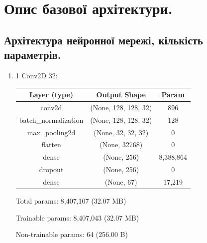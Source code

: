 \documentclass{article}
\begin{document}
    \section{Опис базової архітектури.}
    \subsection{Архітектура нейронної мережі, кількість параметрів.}
    \begin{enumerate}
        \item 1 Conv2D 32:
            \begin{table}[h!]
                \centering
                \begin{tabular}{| c | c | c |}
                    \hline
                    Layer (type) & Output Shape & Param \\
                    \hline
                    conv2d & (None, 128, 128, 32) & 896 \\
                    \hline
                    batch\_normalization & (None, 128, 128, 32) & 128 \\
                    \hline
                    max\_pooling2d & (None, 32, 32, 32) & 0 \\
                    \hline
                    flatten & (None, 32768) & 0 \\
                    \hline
                    dense & (None, 256) & 8,388,864 \\
                    \hline
                    dropout & (None, 256) & 0 \\
                    \hline
                    dense & (None, 67) & 17,219 \\
                    \hline
                \end{tabular}
            \end{table}
        
            Total params: 8,407,107 (32.07 MB)
        
            Trainable params: 8,407,043 (32.07 MB)
        
            Non-trainable params: 64 (256.00 B)
    

\end{enumerate}
\end{document}
